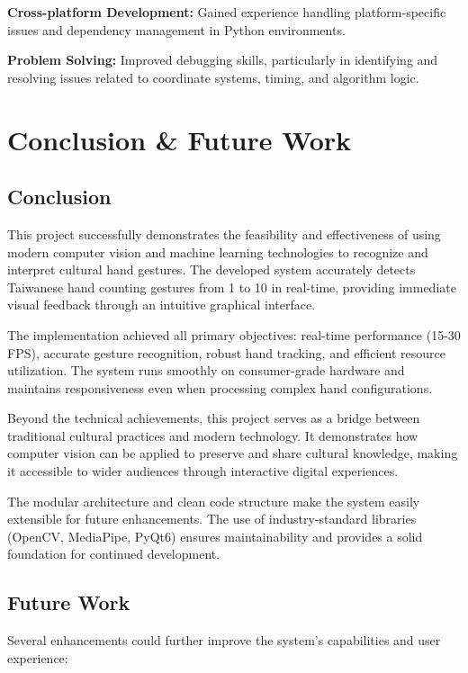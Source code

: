 \documentclass{article}
\begin{document}
\textbf{Cross-platform Development:} Gained experience handling platform-specific issues and dependency management in Python environments.

\textbf{Problem Solving:} Improved debugging skills, particularly in identifying and resolving issues related to coordinate systems, timing, and algorithm logic.

\section{Conclusion \& Future Work}

\subsection{Conclusion}

This project successfully demonstrates the feasibility and effectiveness of using modern computer vision and machine learning technologies to recognize and interpret cultural hand gestures. The developed system accurately detects Taiwanese hand counting gestures from 1 to 10 in real-time, providing immediate visual feedback through an intuitive graphical interface.

The implementation achieved all primary objectives: real-time performance (15-30 FPS), accurate gesture recognition, robust hand tracking, and efficient resource utilization. The system runs smoothly on consumer-grade hardware and maintains responsiveness even when processing complex hand configurations.

Beyond the technical achievements, this project serves as a bridge between traditional cultural practices and modern technology. It demonstrates how computer vision can be applied to preserve and share cultural knowledge, making it accessible to wider audiences through interactive digital experiences.

The modular architecture and clean code structure make the system easily extensible for future enhancements. The use of industry-standard libraries (OpenCV, MediaPipe, PyQt6) ensures maintainability and provides a solid foundation for continued development.

\subsection{Future Work}

Several enhancements could further improve the system's capabilities and user experience:
\end{document}

